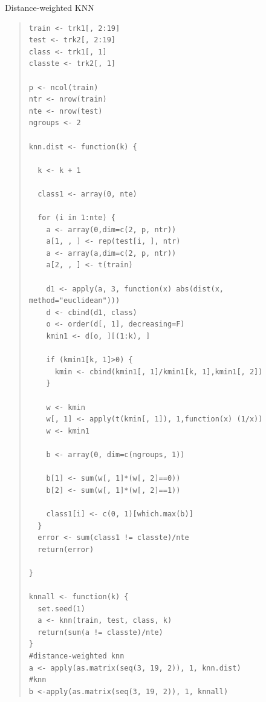\documentclass[11pt, a4paper]{article}
\begin{document}
Distance-weighted KNN
\begin{quote}
\begin{verbatim}
train <- trk1[, 2:19]
test <- trk2[, 2:19]
class <- trk1[, 1]
classte <- trk2[, 1]

p <- ncol(train)
ntr <- nrow(train)
nte <- nrow(test)
ngroups <- 2

knn.dist <- function(k) {
  
  k <- k + 1
  
  class1 <- array(0, nte)
  
  for (i in 1:nte) {
    a <- array(0,dim=c(2, p, ntr))
    a[1, , ] <- rep(test[i, ], ntr)
    a <- array(a,dim=c(2, p, ntr))
    a[2, , ] <- t(train)
    
    d1 <- apply(a, 3, function(x) abs(dist(x, method="euclidean")))
    d <- cbind(d1, class)
    o <- order(d[, 1], decreasing=F)
    kmin1 <- d[o, ][(1:k), ]
    
    if (kmin1[k, 1]>0) {
      kmin <- cbind(kmin1[, 1]/kmin1[k, 1],kmin1[, 2])
    }
    
    w <- kmin
    w[, 1] <- apply(t(kmin[, 1]), 1,function(x) (1/x))
    w <- kmin1
    
    b <- array(0, dim=c(ngroups, 1))
    
    b[1] <- sum(w[, 1]*(w[, 2]==0))
    b[2] <- sum(w[, 1]*(w[, 2]==1))
    
    class1[i] <- c(0, 1)[which.max(b)]
  }
  error <- sum(class1 != classte)/nte
  return(error)
  
}

knnall <- function(k) {
  set.seed(1)
  a <- knn(train, test, class, k)
  return(sum(a != classte)/nte)
}
#distance-weighted knn
a <- apply(as.matrix(seq(3, 19, 2)), 1, knn.dist)
#knn
b <-apply(as.matrix(seq(3, 19, 2)), 1, knnall)
\end{verbatim}
\end{quote}
\end{document}
